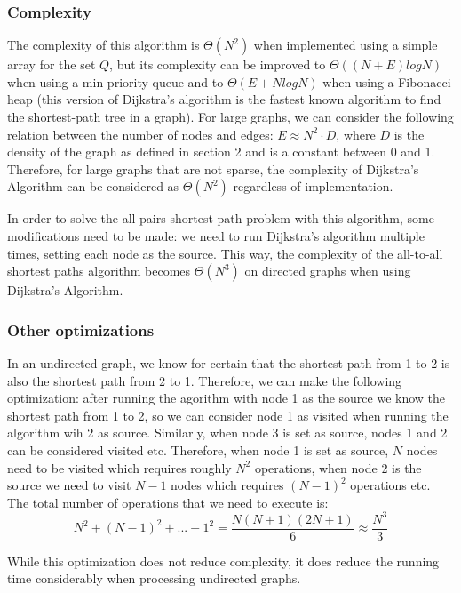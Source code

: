 \documentclass[runningheads]{llncs}
\begin{document}
\subsubsection{Complexity}
The complexity of this algorithm is $\Theta(N^2)$ when implemented using a simple array for the set $Q$, but its complexity can be improved to  $\Theta((N+E)logN)$ when using a min-priority queue and to $\Theta(E+NlogN)$ when using a Fibonacci heap (this version of Dijkstra's algorithm is the fastest known algorithm to find the shortest-path tree in a graph). For large graphs, we can consider the following relation between the number of nodes and edges: $E \approx N^2 \cdot D$, where $D$ is the density of the graph as defined in section 2 and is a constant between 0 and 1. Therefore, for large graphs that are not sparse, the complexity of Dijkstra's Algorithm can be considered as $\Theta(N^2)$ regardless of implementation.

In order to solve the all-pairs shortest path problem with this algorithm, some modifications need to be made: we need to run Dijkstra's algorithm multiple times, setting each node as the source. This way, the complexity of the all-to-all shortest paths algorithm becomes $\Theta(N^3)$ on directed graphs when using Dijkstra's Algorithm.

\subsubsection{Other optimizations}
In an undirected graph, we know for certain that the shortest path from 1 to 2 is also the shortest path from 2 to 1. Therefore, we can make the following optimization: after running the agorithm with node 1 as the source we know the shortest path from 1 to 2, so we can consider node 1 as visited when running the algorithm wih 2 as source. Similarly, when node 3 is set as source, nodes 1 and 2 can be considered visited etc. Therefore, when node 1 is set as source, $N$ nodes need to be visited which requires roughly $N^2$ operations, when node 2 is the source we need to visit $N-1$ nodes which requires $(N-1)^2$ operations etc. The total number of operations that we need to execute is:
\begin{equation}
N^2+(N-1)^2+...+1^2 = \frac{N(N+1)(2N+1)}{6} \approx \frac{N^3}{3}
\end{equation}

While this optimization does not reduce complexity, it does reduce the running time considerably when processing undirected graphs.
\end{document}
